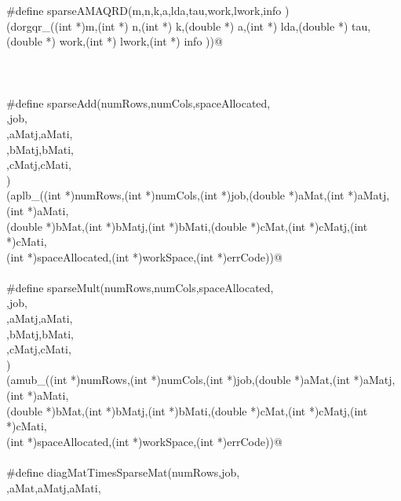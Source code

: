 \documentclass[12pt]{article}
\begin{document}
\begin{flushleft}
\begin{minipage}{\linewidth}
\begin{list}{}{}
\mbox{}\verb@@\\
\mbox{}\verb@@\\
\mbox{}\verb@#define sparseAMAQRD(m,n,k,a,lda,tau,work,lwork,info )\@\\
\mbox{}\verb@(dorgqr_((int *)m,(int *) n,(int *) k,(double *) a,(int *) lda,(double *) tau,(double *) work,(int *) lwork,(int *) info ))@\\
\mbox{}\verb@@\\
\mbox{}\verb@@\\
\mbox{}\verb@@\\
\mbox{}\verb@#define sparseAdd(numRows,numCols,spaceAllocated, \@\\
\mbox{}\verb@workSpace,job, \@\\
\mbox{}\verb@aMat,aMatj,aMati, \@\\
\mbox{}\verb@bMat,bMatj,bMati, \@\\
\mbox{}\verb@cMat,cMatj,cMati, \@\\
\mbox{}\verb@errCode) \@\\
\mbox{}\verb@(aplb_((int *)numRows,(int *)numCols,(int *)job,(double  *)aMat,(int *)aMatj,(int *)aMati, \@\\
\mbox{}\verb@(double *)bMat,(int *)bMatj,(int *)bMati,(double *)cMat,(int *)cMatj,(int *)cMati, \@\\
\mbox{}\verb@(int *)spaceAllocated,(int *)workSpace,(int *)errCode))@\\
\mbox{}\verb@@\\
\mbox{}\verb@#define sparseMult(numRows,numCols,spaceAllocated, \@\\
\mbox{}\verb@workSpace,job, \@\\
\mbox{}\verb@aMat,aMatj,aMati, \@\\
\mbox{}\verb@bMat,bMatj,bMati, \@\\
\mbox{}\verb@cMat,cMatj,cMati, \@\\
\mbox{}\verb@errCode) \@\\
\mbox{}\verb@(amub_((int *)numRows,(int *)numCols,(int *)job,(double *)aMat,(int *)aMatj,(int *)aMati, \@\\
\mbox{}\verb@(double *)bMat,(int *)bMatj,(int *)bMati,(double *)cMat,(int *)cMatj,(int *)cMati, \@\\
\mbox{}\verb@(int *)spaceAllocated,(int *)workSpace,(int *)errCode))@\\
\mbox{}\verb@@\\
\mbox{}\verb@#define diagMatTimesSparseMat(numRows,job, \@\\
\mbox{}\verb@diagElems,aMat,aMatj,aMati, \@\\

\end{list}
\end{minipage}
\end{flushleft}
\end{document}
